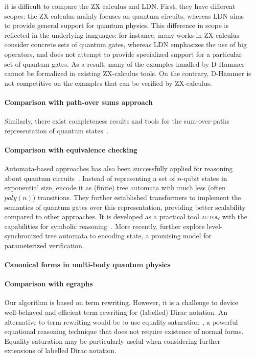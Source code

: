it is difficult to compare the ZX
calculus and LDN. First, they have different scopes: the ZX calculus
mainly focuses on quantum circuits, whereas LDN aims to provide
general support for quantum physics. This difference in scope is
reflected in the underlying languages: for instance, many works in ZX
calculus consider concrete sets of quantum gates, whereas LDN
emphasizes the use of big operators, and does not attempt to provide
specialized support for a particular set of quantum gates. As a
result, many of the examples handled by D-Hammer cannot be formalized
in existing ZX-calculus tools. On the contrary, D-Hammer is not
competitive on the examples that can be verified by ZX-calculus.


\paragraph*{Comparison with path-over sums approach}
Similarly, there exist
completeness results and tools for the sum-over-paths representation
of quantum states~\cite{amy2018towards,amy2023complete}.


\paragraph*{Comparison with equivalence checking}

Automata-based approaches has also been successfully applied for
reasoning about quantum circuits~\cite{AutoQ_pldi_2023}. Instead of
representing a set of $n$-qubit states in exponential size,
\cite{AutoQ_pldi_2023} encode it as (finite) tree automata with much
less (often $\mathit{poly}(n)$) transitions.  They further established
transformers to implement the semantics of quantum gates over this
representation, providing better scalability compared to other
approaches. It is developed as a practical tool \textsc{autoq} with
the capabilities for symbolic reasoning~\cite{AutoQ2023}. More
recently, \cite{AutoQ_popl2025} further explore level-synchronized
tree automata to encoding state, a promising model for parameterized
verification.


\paragraph*{Canonical forms in multi-body quantum physics}

\paragraph*{Comparison with egraphs}
Our algorithm is based on term rewriting. However, it is a challenge
to device well-behaved and efficient term rewriting for (labelled)
Dirac notation. An alternative to term rewriting would be to use
equality saturation~\cite{DBLP:journals/pacmpl/WillseyNWFTP21}, a
powerful equational reasoning technique that does not require
existence of normal forms. Equality saturation may be particularly
useful when considering further extensions of labelled Dirac notation.

